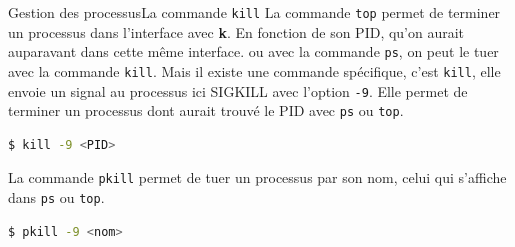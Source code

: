\documentclass{beamer}
\begin{document}
    \begin{frame}[fragile]{Gestion des processus}{La commande \lstinline{kill}}
        La commande \lstinline{top} permet de terminer un processus dans l'interface avec \textbf{k}.
        En fonction de son PID, qu'on aurait auparavant dans cette même interface.
        ou avec la commande \lstinline{ps}, on peut le tuer avec la commande \lstinline{kill}.
        \bigbreak
        Mais il existe une commande spécifique, c'est \lstinline{kill}, elle envoie un signal au processus ici SIGKILL avec l'option \lstinline{-9}.
        Elle permet de terminer un processus dont aurait trouvé le PID avec \lstinline{ps} ou \lstinline{top}.
        \begin{lstlisting}[language=bash]
$ kill -9 <PID>
        \end{lstlisting}
        \bigbreak
        La commande \lstinline{pkill} permet de tuer un processus par son nom, celui qui s'affiche dans \lstinline{ps} ou \lstinline{top}.
        \begin{lstlisting}[language=bash]
$ pkill -9 <nom>
        \end{lstlisting}
    \end{frame}
\end{document}
